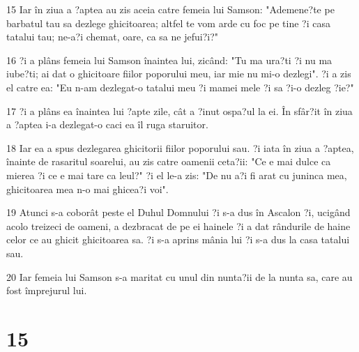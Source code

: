 \par 15 Iar în ziua a ?aptea au zis aceia catre femeia lui Samson: "Ademene?te pe barbatul tau sa dezlege ghicitoarea; altfel te vom arde cu foc pe tine ?i casa tatalui tau; ne-a?i chemat, oare, ca sa ne jefui?i?"
\par 16 ?i a plâns femeia lui Samson înaintea lui, zicând: "Tu ma ura?ti ?i nu ma iube?ti; ai dat o ghicitoare fiilor poporului meu, iar mie nu mi-o dezlegi". ?i a zis el catre ea: "Eu n-am dezlegat-o tatalui meu ?i mamei mele ?i sa ?i-o dezleg ?ie?"
\par 17 ?i a plâns ea înaintea lui ?apte zile, cât a ?inut ospa?ul la ei. În sfâr?it în ziua a ?aptea i-a dezlegat-o caci ea îl ruga staruitor.
\par 18 Iar ea a spus dezlegarea ghicitorii fiilor poporului sau. ?i iata în ziua a ?aptea, înainte de rasaritul soarelui, au zis catre oamenii ceta?ii: "Ce e mai dulce ca mierea ?i ce e mai tare ca leul?" ?i el le-a zis: "De nu a?i fi arat cu juninca mea, ghicitoarea mea n-o mai ghicea?i voi".
\par 19 Atunci s-a coborât peste el Duhul Domnului ?i s-a dus în Ascalon ?i, ucigând acolo treizeci de oameni, a dezbracat de pe ei hainele ?i a dat rândurile de haine celor ce au ghicit ghicitoarea sa. ?i s-a aprins mânia lui ?i s-a dus la casa tatalui sau.
\par 20 Iar femeia lui Samson s-a maritat cu unul din nunta?ii de la nunta sa, care au fost împrejurul lui.

\chapter{15}

